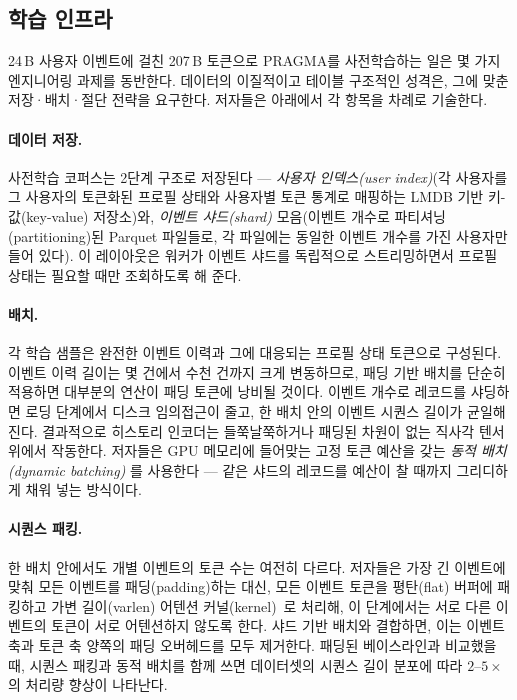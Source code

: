 \subsection{학습 인프라}
\label{sec:train_infra}

24\,B 사용자 이벤트에 걸친 207\,B 토큰으로 PRAGMA를 사전학습하는 일은 몇 가지 엔지니어링 과제를 동반한다.
데이터의 이질적이고 테이블 구조적인 성격은, 그에 맞춘 저장·배치·절단 전략을 요구한다.
저자들은 아래에서 각 항목을 차례로 기술한다.

\paragraph*{데이터 저장.}
사전학습 코퍼스는 2단계 구조로 저장된다 — \emph{사용자 인덱스(user index)}(각 사용자를 그 사용자의 토큰화된 프로필 상태와 사용자별 토큰 통계로 매핑하는 LMDB 기반 키-값(key-value) 저장소)와, \emph{이벤트 샤드(shard)} 모음(이벤트 개수로 파티셔닝(partitioning)된 Parquet 파일들로, 각 파일에는 동일한 이벤트 개수를 가진 사용자만 들어 있다).
이 레이아웃은 워커가 이벤트 샤드를 독립적으로 스트리밍하면서 프로필 상태는 필요할 때만 조회하도록 해 준다.

\paragraph*{배치.}
각 학습 샘플은 완전한 이벤트 이력과 그에 대응되는 프로필 상태 토큰으로 구성된다.
이벤트 이력 길이는 몇 건에서 수천 건까지 크게 변동하므로, 패딩 기반 배치를 단순히 적용하면 대부분의 연산이 패딩 토큰에 낭비될 것이다.
이벤트 개수로 레코드를 샤딩하면 로딩 단계에서 디스크 임의접근이 줄고, 한 배치 안의 이벤트 시퀀스 길이가 균일해진다. 결과적으로 히스토리 인코더는 들쭉날쭉하거나 패딩된 차원이 없는 직사각 텐서 위에서 작동한다.
저자들은 GPU 메모리에 들어맞는 고정 토큰 예산을 갖는 \emph{동적 배치(dynamic batching)} 를 사용한다 — 같은 샤드의 레코드를 예산이 찰 때까지 그리디하게 채워 넣는 방식이다.

\paragraph*{시퀀스 패킹.}
한 배치 안에서도 개별 이벤트의 토큰 수는 여전히 다르다.
저자들은 가장 긴 이벤트에 맞춰 모든 이벤트를 패딩(padding)하는 대신, 모든 이벤트 토큰을 평탄(flat) 버퍼에 패킹하고 가변 길이(varlen) 어텐션 커널(kernel)~\citep{dao2022flashattention}로 처리해, 이 단계에서는 서로 다른 이벤트의 토큰이 서로 어텐션하지 않도록 한다.
샤드 기반 배치와 결합하면, 이는 이벤트 축과 토큰 축 양쪽의 패딩 오버헤드를 모두 제거한다.
패딩된 베이스라인과 비교했을 때, 시퀀스 패킹과 동적 배치를 함께 쓰면 데이터셋의 시퀀스 길이 분포에 따라 $2$--$5{\times}$의 처리량 향상이 나타난다.

